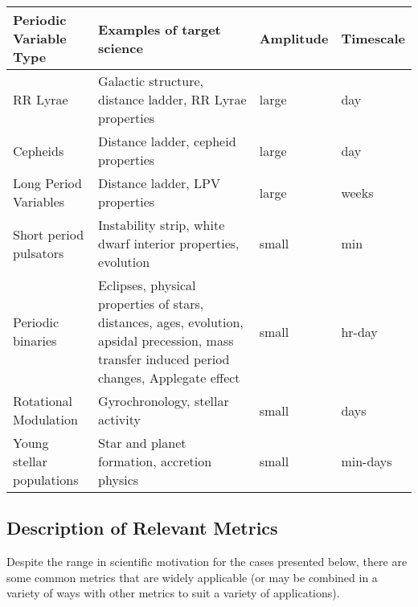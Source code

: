 
\begin{center}
\begin{tabular}{| l | p{8cm} |l | l |}
\hline Periodic Variable Type & Examples of target science & Amplitude & Timescale\\
\hline
RR Lyrae & Galactic structure, distance ladder, RR Lyrae properties&  large &  day \\
Cepheids & Distance ladder, cepheid properties&  large &  day \\
Long Period Variables & Distance ladder, LPV properties & large  &  weeks \\
Short period pulsators & Instability strip, white dwarf interior properties, evolution&  small & min  \\
Periodic binaries & Eclipses, physical properties of stars, distances, ages, evolution, apsidal precession, mass transfer induced period changes, Applegate effect &  small &  hr-day \\
Rotational Modulation & Gyrochronology, stellar activity& small  &  days \\
Young stellar populations & Star and planet formation, accretion physics & small  &  min-days \\
 \hline \end{tabular}
 \end{center}

\subsection{Description of Relevant Metrics}
\label{sec:keyword:variablemetrics}

Despite the range in scientific motivation for the cases presented below, there are some common metrics that are widely applicable (or may be combined in a variety of ways with other metrics to suit a variety of applications). 

